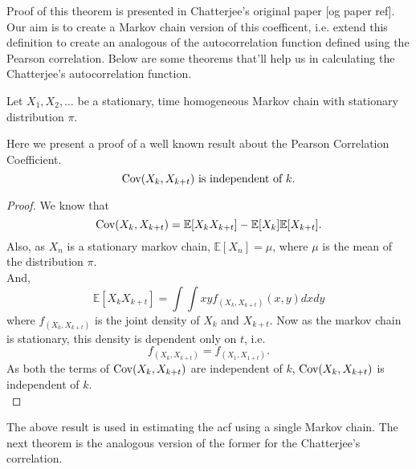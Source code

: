 Proof of this theorem is presented in Chatterjee's original paper [og paper ref].
\newpage
Our aim is to create a Markov chain version of this coefficent, i.e. extend this definition to create an analogous of the autocorrelation function defined using the Pearson correlation.
Below are some theorems that'll help us in calculating the Chatterjee's autocorrelation function.
\newline

Let $X_1, X_2, \dots$ be a stationary, time homogeneous Markov chain with stationary distribution $\pi$.
\begin{theorem}
    Here we present a proof of a well known result about the Pearson Correlation Coefficient.
    $$\text{Cov}(X_k, X_{k+t}) \text{ is independent of } k.$$
    \begin{proof}
        We know that
        $$\text{Cov}(X_k, X_{k+t}) = \mathbb{E}[X_k X_{k+t}] - \mathbb{E}[X_k]\mathbb{E}[X_{k+t}].$$
        Also, as $X_n$ is a stationary markov chain, $\mathbb{E}[X_n] = \mu$, where $\mu$ is the mean of the distribution $\pi$.\\
        And,
        $$\mathbb{E}[X_k X_{k+t}] = \int\int xyf_{(X_k, X_{k+t})}(x, y)dxdy$$
        where $f_{(X_k, X_{k+t})}$ is the joint density of $X_k$ and $X_{k+t}$. Now as the markov chain is stationary, this density is dependent only on $t$, i.e. $$f_{(X_k, X_{k+t})} = f_{(X_1, X_{1+t})}.$$
        As both the terms of $\text{Cov}(X_k, X_{k+t})$ are independent of $k$, $\text{Cov}(X_k, X_{k+t})$ is independent of $k$.\\
    \end{proof}
\end{theorem}

The above result is used in estimating the acf using a single Markov chain. The next theorem is the analogous version of the former for the Chatterjee's correlation.

